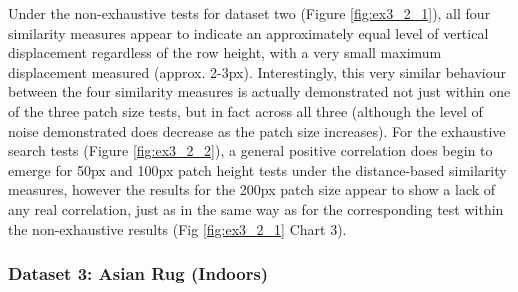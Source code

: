 Under the non-exhaustive tests for dataset two (Figure \ref{fig:ex3_2_1}), all four similarity measures appear to indicate an approximately equal level of vertical displacement regardless of the row height, with a very small maximum displacement measured (approx. 2-3px). Interestingly, this very similar behaviour between the four similarity measures is actually demonstrated not just within one of the three patch size tests, but in fact across all three (although the level of noise demonstrated does decrease as the patch size increases). For the exhaustive search tests (Figure \ref{fig:ex3_2_2}), a general positive correlation does begin to emerge for 50px and 100px patch height tests under the distance-based similarity measures, however the results for the 200px patch size appear to show a lack of any real correlation, just as in the same way as for the corresponding test within the non-exhaustive results (Fig \ref{fig:ex3_2_1} Chart 3). 

\clearpage
\subsubsection{Dataset 3: Asian Rug (Indoors)}

